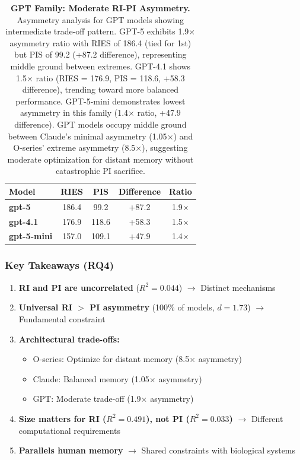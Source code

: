 \documentclass{article}
\begin{document}
\begin{table}[t]
\centering
\caption{\textbf{GPT Family: Moderate RI-PI Asymmetry.}
Asymmetry analysis for GPT models showing intermediate trade-off pattern.
GPT-5 exhibits 1.9$\times$ asymmetry ratio with RIES of 186.4 (tied for 1st) but PIS of 99.2 (+87.2 difference), representing middle ground between extremes.
GPT-4.1 shows 1.5$\times$ ratio (RIES = 176.9, PIS = 118.6, +58.3 difference), trending toward more balanced performance.
GPT-5-mini demonstrates lowest asymmetry in this family (1.4$\times$ ratio, +47.9 difference).
GPT models occupy middle ground between Claude's minimal asymmetry (1.05$\times$) and O-series' extreme asymmetry (8.5$\times$), suggesting moderate optimization for distant memory without catastrophic PI sacrifice.}
\begin{tabular}{lcccc}
\toprule
Model & RIES & PIS & Difference & Ratio \\
\midrule
\textbf{gpt-5} & 186.4 & 99.2 & +87.2 & 1.9$\times$ \\
\textbf{gpt-4.1} & 176.9 & 118.6 & +58.3 & 1.5$\times$ \\
\textbf{gpt-5-mini} & 157.0 & 109.1 & +47.9 & 1.4$\times$ \\
\bottomrule
\end{tabular}
\end{table}

\subsubsection{Key Takeaways (RQ4)}

\begin{enumerate}
    \item \textbf{RI and PI are uncorrelated} ($R^2 = 0.044$) $\rightarrow$ Distinct mechanisms
    \item \textbf{Universal RI $>$ PI asymmetry} (100\% of models, $d = 1.73$) $\rightarrow$ Fundamental constraint
    \item \textbf{Architectural trade-offs:}
    \begin{itemize}[itemsep=2pt,topsep=3pt,parsep=0pt]
        \item O-series: Optimize for distant memory (8.5$\times$ asymmetry)
        \item Claude: Balanced memory (1.05$\times$ asymmetry)
        \item GPT: Moderate trade-off (1.9$\times$ asymmetry)
    \end{itemize}
    \item \textbf{Size matters for RI ($R^2=0.491$), not PI ($R^2=0.033$)} $\rightarrow$ Different computational requirements
    \item \textbf{Parallels human memory} $\rightarrow$ Shared constraints with biological systems
\end{enumerate}
\end{document}
